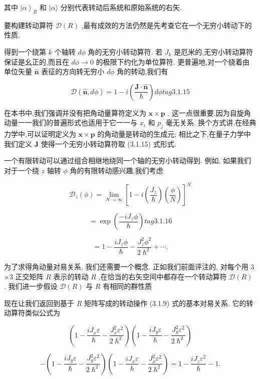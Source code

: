 其中 ${\left| \alpha \right\rangle }_{R}$ 和 $|\alpha \rangle$ 分别代表转动后系统和原始系统的右矢. 

要构建转动算符 $\mathcal{D}\left( R\right)$ ,最有成效的方法仍然是先考查它在一个无穷小转动下的性质. 

得到一个绕第 $k$ 个轴转 ${d\phi }$ 角的无穷小转动算符. 若 ${J}_{k}$ 是厄米的,无穷小转动算符保证是幺正的,而且在 ${d\phi } \rightarrow 0$ 的极限下约化为单位算符. 更普遍地,对一个绕着由单位矢量 $\widehat{\mathbf{n}}$ 表征的方向转无穷小 ${d\phi }$ 角的转动,我们有

$$
\mathcal{D}\left( {\widehat{\mathbf{n}},{d\phi }}\right) = 1 - i\left( \frac{\mathbf{J} \cdot \widehat{\mathbf{n}}}{\hslash }\right) {d\phi } tag{3.1.15}
$$

在本书中,我们强调并没有把角动量算符定义为 $\mathbf{x} \times \mathbf{p}$ . 这一点很重要,因为自旋角动量一一我们的普遍形式也适用于它一一与 ${x}_{i}$ 和 ${p}_{j}$ 毫无关系. 换个方式讲,在经典力学中,可以证明定义为 $\mathbf{x} \times \mathbf{p}$ 的角动量是转动的生成元; 相比之下,在量子力学中我们定义 $\mathbf{J}$ 使得一个无穷小转动算符取 (3.1.15) 式形式.

一个有限转动可以通过组合相继地绕同一个轴的无穷小转动得到. 例如, 如果我们对于一个绕 $z$ 轴转 $\phi$ 角的有限转动感兴趣,我们考虑

$$
{\mathcal{D}}_{z}\left( \phi \right) = \mathop{\lim }\limits_{{N \rightarrow \infty }}{\left\lbrack 1 - i\left( \frac{{J}_{z}}{\hslash }\right) \left( \frac{\phi }{N}\right) \right\rbrack }^{N}
$$

$$
= \exp \left( \frac{-i{J}_{z}\phi }{\hslash }\right) tag{3. 1.16}
$$

$$
= 1 - \frac{i{J}_{z}\phi }{\hslash } - \frac{{J}_{z}^{2}{\phi }^{2}}{2{\hslash }^{2}} + \cdots .
$$

为了求得角动量对易关系, 我们还需要一个概念. 正如我们前面评注的, 对每个用 3 $\times 3$ 正交矩阵 $R$ 表示的转动 $R$ ,在恰当的右矢空间中都存在一个转动算符 $\mathcal{D}\left( R\right)$ . 我们进一步假设 $\mathcal{D}\left( R\right)$ 与 $R$ 有相同的群性质


现在让我们返回到基于 $R$ 矩阵写成的转动操作 (3.1.9) 式的基本对易关系. 它的转动算符类似公式为

$$
\left( {1 - \frac{i{J}_{x}\varepsilon }{\hslash } - \frac{{J}_{x}^{2}{\varepsilon }^{2}}{2{\hslash }^{2}}}\right) \left( {1 - \frac{i{J}_{y}\varepsilon }{\hslash } - \frac{{J}_{y}^{2}{\varepsilon }^{2}}{2{\hslash }^{2}}}\right) 
$$

$$
- \left( {1 - \frac{i{J}_{y}\varepsilon }{\hslash } - \frac{{J}_{y}^{2}{\varepsilon }^{2}}{2{\hslash }^{2}}}\right) \left( {1 - \frac{i{J}_{x}\varepsilon }{\hslash } - \frac{{J}_{x}^{2}{\varepsilon }^{2}}{2{\hslash }^{2}}}\right) = 1 - \frac{i{J}_{z}{\varepsilon }^{2}}{\hslash } - 1.
$$

